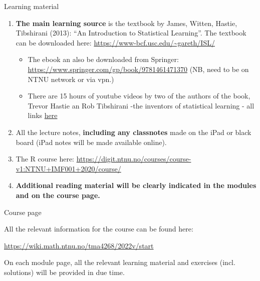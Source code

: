\documentclass[10pt,ignorenonframetext,]{beamer}
\begin{document}
\begin{frame}{Learning material}
\protect\hypertarget{learning-material}{}

\begin{enumerate}
[1)]
\item
  \textbf{The main learning source} is the textbook by James, Witten,
  Hastie, Tibshirani (2013): ``An Introduction to Statistical
  Learning''. The textbook can be downloaded here:
  \url{https://www-bcf.usc.edu/~gareth/ISL/}

  \begin{itemize}
  \item
    The ebook an also be downloaded from Springer:
    \url{https://www.springer.com/gp/book/9781461471370} (NB, need to be
    on NTNU network or via vpn.)
  \item
    There are 15 hours of youtube videos by two of the authors of the
    book, Trevor Hastie an Rob Tibshirani -the inventors of statistical
    learning - all links
    \href{https://www.r-bloggers.com/in-depth-introduction-to-machine-learning-in-15-hours-of-expert-videos/}{here}
  \end{itemize}
\item
  All the lecture notes, \textbf{including any classnotes} made on the
  iPad or black board (iPad notes will be made available online).
\item
  The R course here:
  \url{https://digit.ntnu.no/courses/course-v1:NTNU+IMF001+2020/course/}
\item
  \textbf{Additional reading material will be clearly indicated in the
  modules and on the course page.}
\end{enumerate}

\end{frame}

\begin{frame}{Course page}
\protect\hypertarget{course-page}{}

All the relevant information for the course can be found here:

\url{https://wiki.math.ntnu.no/tma4268/2022v/start}

On each module page, all the relevant learning material and exercises
(incl. solutions) will be provided in due time.

\end{frame}
\end{document}
